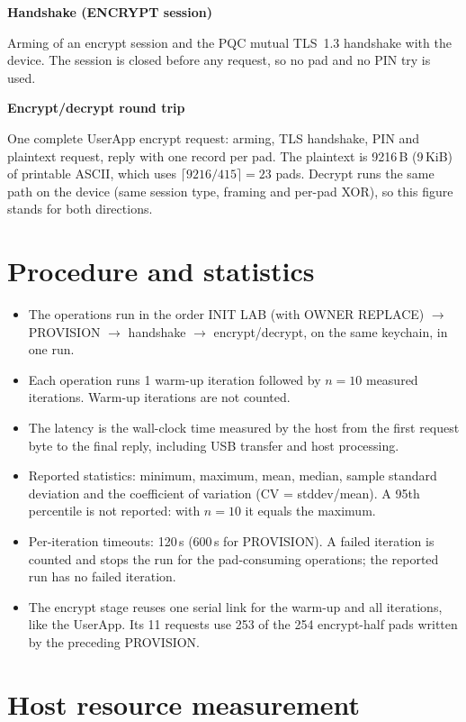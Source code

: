 \documentclass[11pt,a4paper]{report}
\newcommand{\benchcard}[2]{%
  \begin{tcolorbox}[
    colback=cardbg, colframe=cardborder, boxrule=0.5pt, arc=2.5pt,
    left=8pt, right=8pt, top=6pt, bottom=6pt,
    before skip=4pt, after skip=4pt, breakable]
  {\small\bfseries #1}\par
  \vspace{3pt}
  {\small\color{black!85} #2}
  \end{tcolorbox}%
}
\begin{document}
\benchcard{Handshake (ENCRYPT session)}{Arming of an encrypt session and the PQC mutual TLS~1.3 handshake with the device. The session is closed before any request, so no pad and no PIN try is used.}

\benchcard{Encrypt/decrypt round trip}{One complete UserApp encrypt request: arming, TLS handshake, PIN and plaintext request, reply with one record per pad. The plaintext is 9216\,B (9\,KiB) of printable ASCII, which uses $\lceil 9216/415 \rceil = 23$ pads. Decrypt runs the same path on the device (same session type, framing and per-pad XOR), so this figure stands for both directions.}

\section{Procedure and statistics}

\begin{itemize}
\item The operations run in the order INIT LAB (with OWNER REPLACE) $\rightarrow$ PROVISION $\rightarrow$ handshake $\rightarrow$ encrypt/decrypt, on the same keychain, in one run.
\item Each operation runs 1 warm-up iteration followed by $n = 10$ measured iterations. Warm-up iterations are not counted.
\item The latency is the wall-clock time measured by the host from the first request byte to the final reply, including USB transfer and host processing.
\item Reported statistics: minimum, maximum, mean, median, sample standard deviation and the coefficient of variation (CV = stddev/mean). A 95th percentile is not reported: with $n = 10$ it equals the maximum.
\item Per-iteration timeouts: 120\,s (600\,s for PROVISION). A failed iteration is counted and stops the run for the pad-consuming operations; the reported run has no failed iteration.
\item The encrypt stage reuses one serial link for the warm-up and all iterations, like the UserApp. Its 11 requests use 253 of the 254 encrypt-half pads written by the preceding PROVISION.
\end{itemize}

\section{Host resource measurement}
\end{document}
